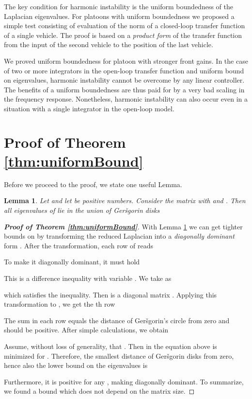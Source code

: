 \documentclass[technote, 10pt, twoside]{IEEEtran}
\theoremstyle{plain}
\newtheorem{lemma}{Lemma}
\theoremstyle{definition}
\theoremstyle{assump}
\begin{document}
The key condition for harmonic
instability is the uniform boundedness of the Laplacian eigenvalues. For
platoons with uniform boundedness we proposed a simple
test consisting of evaluation of the
 norm of a closed-loop transfer function of a single
vehicle.
The proof is based on a \textit{product form} of the transfer function
from the input of the second vehicle to the position of the last vehicle. 

We proved uniform boundedness for platoon with stronger front gains. In the case
of two or more integrators in the open-loop transfer function and uniform bound
on eigenvalues, harmonic instability cannot be overcome by any linear
controller.
The benefits of a uniform boundedness are thus
paid for by a very bad scaling in the frequency response.
Nonetheless, harmonic instability can also occur even in a situation with a single integrator in the
open-loop model.



\appendices
\section{Proof of Theorem \ref{thm:uniformBound}}
Before we proceed to the proof, we state one useful Lemma.
\begin{lemma}{\cite[Cor. 6.1.6]{Horn1996}}
	Let  and let  be positive numbers. Consider the matrix  with  and . Then all eigenvalues of  lie in the union of Ger\v{s}gorin disks
	
	\label{cor:diagTransf}
\end{lemma}	
\begin{proof}[\textbf{Proof of Theorem \ref{thm:uniformBound}}]
With Lemma \ref{cor:diagTransf} we can get tighter bounds on  by transforming the reduced Laplacian  into a \textit{diagonally dominant} form . After the transformation, each row of  reads

To make it diagonally dominant, it must hold

This is a difference inequality with variable . 
We take  as

which satisfies the inequality. Then  is a diagonal matrix . Applying this transformation to , we get the th row
		
The sum in each row equals the distance  of Ger\v{s}gorin's circle from zero and should be positive. After simple calculations, we obtain

Assume, without loss of generality, that . Then  in the equation above is minimized for . Therefore, the smallest distance of Ger\v{s}gorin disks from zero, hence also the lower bound on the eigenvalues is 

Furthermore, it is positive for any , making  diagonally dominant. To summarize, we found a bound which does not depend on the matrix size.
\end{proof}
\end{document}
